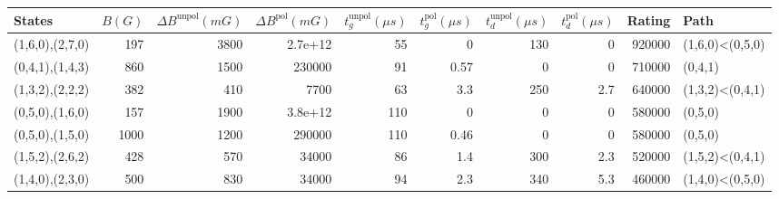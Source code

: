 \begin{tabular}{lrrrrrrrrl}
\hline
 {States}        &   {$B(G)$} &   {$\Delta B^{\text{unpol}}(mG)$} &   {$\Delta B^{\text{pol}}(mG)$} &   {$t^{\text{unpol}}_{g}(\mu s)$} &   {$t^{\text{pol}}_{g}(\mu s)$} &   {$t^{\text{unpol}}_{d}(\mu s)$} &   {$t^{\text{pol}}_{d}(\mu s)$} &   {Rating} & {Path}               \\
\hline
 (1,6,0),(2,7,0) &        197 &                              3800 &                         2.7e+12 &                                55 &                            0    &                               130 &                             0   &     920000 & (1,6,0)<(0,5,0)      \\
 (0,4,1),(1,4,3) &        860 &                              1500 &                    230000       &                                91 &                            0.57 &                                 0 &                             0   &     710000 & (0,4,1)              \\
 (1,3,2),(2,2,2) &        382 &                               410 &                      7700       &                                63 &                            3.3  &                               250 &                             2.7 &     640000 & (1,3,2)<(0,4,1)      \\
 (0,5,0),(1,6,0) &        157 &                              1900 &                         3.8e+12 &                               110 &                            0    &                                 0 &                             0   &     580000 & (0,5,0)              \\
 (0,5,0),(1,5,0) &       1000 &                              1200 &                    290000       &                               110 &                            0.46 &                                 0 &                             0   &     580000 & (0,5,0)              \\
 (1,5,2),(2,6,2) &        428 &                               570 &                     34000       &                                86 &                            1.4  &                               300 &                             2.3 &     520000 & (1,5,2)<(0,4,1)      \\
 (1,4,0),(2,3,0) &        500 &                               830 &                     34000       &                                94 &                            2.3  &                               340 &                             5.3 &     460000 & (1,4,0)<(0,5,0)      \\

\end{tabular}
